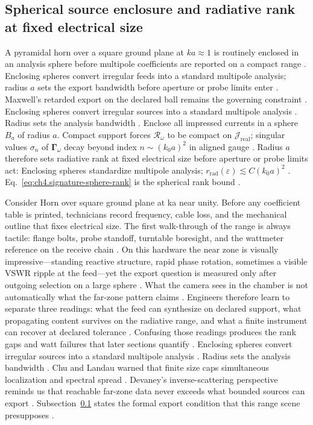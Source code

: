 \subsection{Spherical source enclosure and radiative rank at fixed electrical size}
\label{sec:ch43.signature-sphere}
A pyramidal horn over a square ground plane at $ka\approx1$ is routinely enclosed in an analysis sphere before multipole coefficients are reported on a compact range \cite{hansen1988}. Enclosing spheres convert irregular feeds into a standard multipole analysis; radius $a$ sets the export bandwidth before aperture or probe limits enter \cite{stratton1941}. Maxwell's retarded export on the declared ball remains the governing constraint \cite{maxwell1873}.
Enclosing spheres convert irregular sources into a standard multipole analysis \cite{stratton1941}. Radius sets the analysis bandwidth \cite{hansen1988}.
Enclose all impressed currents in a sphere $B_a$ of radius $a$. Compact support forces $\mathcal{R}_\omega$ to be compact on $\mathcal{J}_{\mathrm{real}}$; singular values $\sigma_n$ of $\boldsymbol{\Gamma}_\omega$ decay beyond index $n\sim (k_0 a)^2$ in aligned gauge \cite{stratton1941}. Radius $a$ therefore sets radiative rank at fixed electrical size before aperture or probe limits act:
Enclosing spheres standardize multipole analysis; $r_{\mathrm{rad}}(\varepsilon)\lesssim C(k_0 a)^2$ \cite{stratton1941}. Eq.~\eqref{eq:ch4.signature-sphere-rank} is the spherical rank bound \cite{devaney2004}.
\medskip
\begin{physicalvignette}
Consider Horn over square ground plane at ka near unity. Before any coefficient table is printed, technicians record frequency, cable loss, and the mechanical outline that fixes electrical size. The first walk-through of the range is always tactile: flange bolts, probe standoff, turntable boresight, and the wattmeter reference on the receive chain \cite{hansen1988}.
On this hardware the near zone is visually impressive---standing reactive structure, rapid phase rotation, sometimes a visible VSWR ripple at the feed---yet the export question is measured only after outgoing selection on a large sphere \cite{harrington2001}. What the camera sees in the chamber is not automatically what the far-zone pattern claims \cite{stratton1941}.
Engineers therefore learn to separate three readings: what the feed can synthesize on declared support, what propagating content survives on the radiative range, and what a finite instrument can recover at declared tolerance \cite{devaney2004}. Confusing those readings produces the rank gaps and watt failures that later sections quantify \cite{pal2026}.
Enclosing spheres convert irregular sources into a standard multipole analysis . Radius sets the analysis bandwidth .
Chu and Landau warned that finite size caps simultaneous localization and spectral spread \cite{chu1948}. Devaney's inverse-scattering perspective reminds us that reachable far-zone data never exceeds what bounded sources can export \cite{devaney2004}.
Subsection~\ref{sec:ch43.signature-sphere} states the formal export condition that this range scene presupposes \cite{stratton1941}.
\end{physicalvignette}
